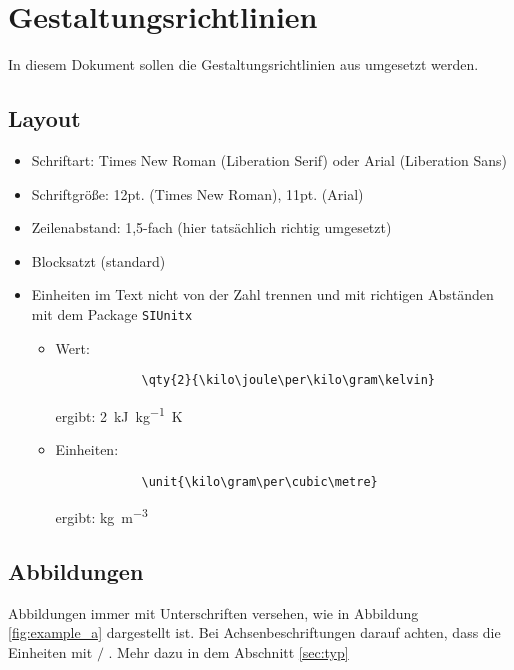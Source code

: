 




\tableofcontents

\newpage

\section{Gestaltungsrichtlinien}

In diesem Dokument sollen die Gestaltungsrichtlinien aus  umgesetzt werden.

\subsection{Layout}

\begin{itemize}
	\item Schriftart: Times New Roman (Liberation Serif) oder Arial (Liberation Sans)
	\item Schriftgröße: 12pt. (Times New Roman), 11pt. (Arial)
	\item Zeilenabstand: 1,5-fach (hier tatsächlich richtig umgesetzt)
	\item Blocksatzt (standard)
	\item Einheiten im Text nicht von der Zahl trennen und mit richtigen Abständen mit dem Package \texttt{SIUnitx}

	\begin{itemize}
		\item Wert:\begin{verbatim}
			\qty{2}{\kilo\joule\per\kilo\gram\kelvin}
		\end{verbatim} 
		ergibt: \qty{2}{\kilo\joule\per\kilo\gram\kelvin} 	
		\item Einheiten: \begin{verbatim}
			\unit{\kilo\gram\per\cubic\metre}
		\end{verbatim}
		ergibt: \unit{\kilo\gram\per\cubic\metre}
	\end{itemize}
	
\end{itemize}

\subsection{Abbildungen}

Abbildungen immer mit Unterschriften versehen, wie in Abbildung \ref{fig:example_a} dargestellt ist. 
Bei Achsenbeschriftungen darauf achten, dass die Einheiten mit \(\mathbin{/}\) .
Mehr dazu in dem Abschnitt \ref{sec:typ} 

